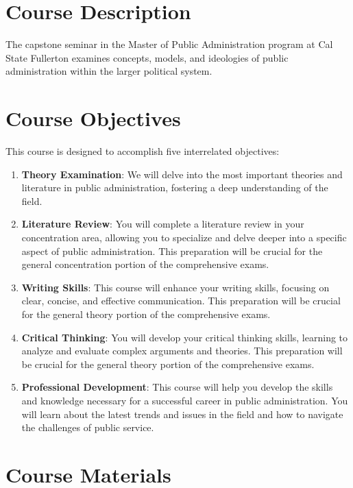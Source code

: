 \documentclass[12pt, letterpaper]{article}
\begin{document}
    \section{Course Description}
    The capstone seminar in the Master of Public Administration program at Cal State Fullerton examines concepts, models, and ideologies of public administration within the larger political system.
    
    \section{Course Objectives}
    This course is designed to accomplish five interrelated objectives:
    
    \begin{enumerate}
        \item \textbf{Theory Examination}: We will delve into the most important theories and literature in public administration, fostering a deep understanding of the field.
        \item \textbf{Literature Review}: You will complete a literature review in your concentration area, allowing you to specialize and delve deeper into a specific aspect of public administration. This preparation will be crucial for the general concentration portion of the comprehensive exams.
        \item \textbf{Writing Skills}: This course will enhance your writing skills, focusing on clear, concise, and effective communication. This preparation will be crucial for the general theory portion of the comprehensive exams.
        \item \textbf{Critical Thinking}: You will develop your critical thinking skills, learning to analyze and evaluate complex arguments and theories. This preparation will be crucial for the general theory portion of the comprehensive exams.
        \item \textbf{Professional Development}: This course will help you develop the skills and knowledge necessary for a successful career in public administration. You will learn about the latest trends and issues in the field and how to navigate the challenges of public service.
    \end{enumerate}
    
    
    \section{Course Materials}
\end{document}
